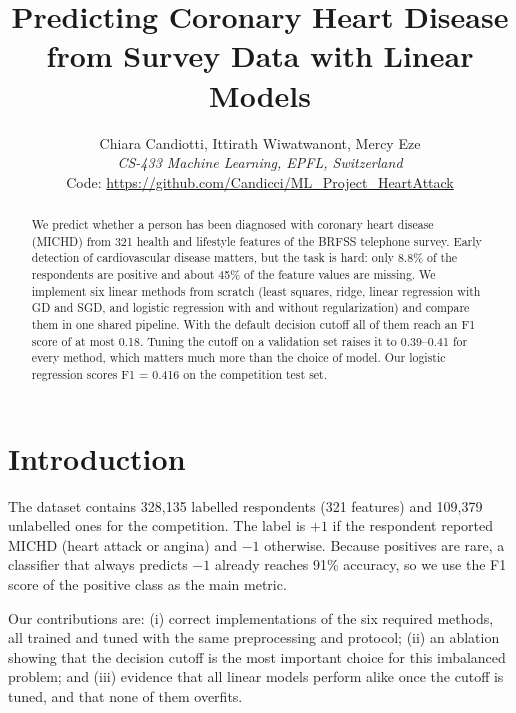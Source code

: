 \documentclass[10pt,conference,compsocconf]{IEEEtran}
\begin{document}
\title{Predicting Coronary Heart Disease from Survey Data with Linear Models}

\author{
  Chiara Candiotti, Ittirath Wiwatwanont, Mercy Eze\\
  \textit{CS-433 Machine Learning, EPFL, Switzerland}\\
  Code: \url{https://github.com/Candicci/ML_Project_HeartAttack}
}

\maketitle

\begin{abstract}
  We predict whether a person has been diagnosed with coronary heart disease
  (MICHD) from 321 health and lifestyle features of the BRFSS telephone survey.
  Early detection of cardiovascular disease matters, but the task is hard: only
  8.8\% of the respondents are positive and about 45\% of the feature values are
  missing. We implement six linear methods from scratch (least squares, ridge,
  linear regression with GD and SGD, and logistic regression with and without
  regularization) and compare them in one shared pipeline. With the default
  decision cutoff all of them reach an F1 score of at most 0.18. Tuning the cutoff
  on a validation set raises it to 0.39--0.41 for every method, which matters much
  more than the choice of model. Our logistic regression scores F1 = 0.416 on the
  competition test set.
\end{abstract}

\section{Introduction}

The dataset contains 328,135 labelled respondents (321 features) and 109,379
unlabelled ones for the competition. The label is $+1$ if the respondent reported
MICHD (heart attack or angina) and $-1$ otherwise. Because positives are rare, a
classifier that always predicts $-1$ already reaches 91\% accuracy, so we use the F1
score of the positive class as the main metric.

Our contributions are: (i) correct implementations of the six required methods,
all trained and tuned with the same preprocessing and protocol; (ii) an ablation
showing that the decision cutoff is the most important choice for this imbalanced
problem; and (iii) evidence that all linear models perform alike once the cutoff
is tuned, and that none of them overfits.
\end{document}
